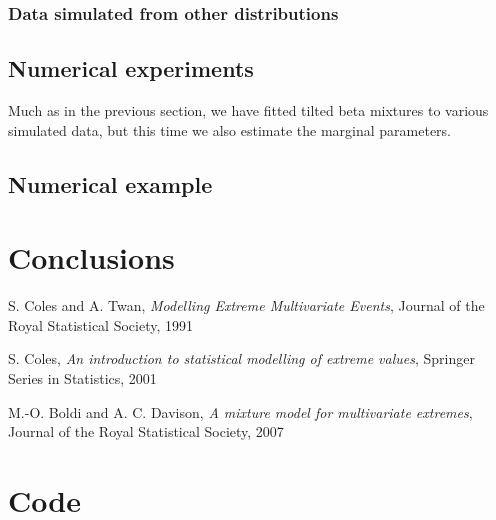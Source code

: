 \documentclass[10pt]{report}
\begin{document}
\subsection{Data simulated from other distributions}
\label{sec:wrongdist}

\section{Numerical experiments}
Much as in the previous section, we have fitted tilted beta mixtures to various simulated data, but this time we also estimate the marginal parameters.

\section{Numerical example}

\chapter{Conclusions}

\begin{thebibliography}{9}

S. Coles and A. Twan, \textit{Modelling Extreme Multivariate Events}, Journal of the Royal Statistical Society, 1991

S. Coles, \textit{An introduction to statistical modelling of extreme values}, Springer Series in Statistics, 2001


M.-O. Boldi and A. C. Davison, \textit{A mixture model for multivariate extremes}, Journal of the Royal Statistical Society, 2007

\end{thebibliography}


\chapter*{Code}



\end{document}
